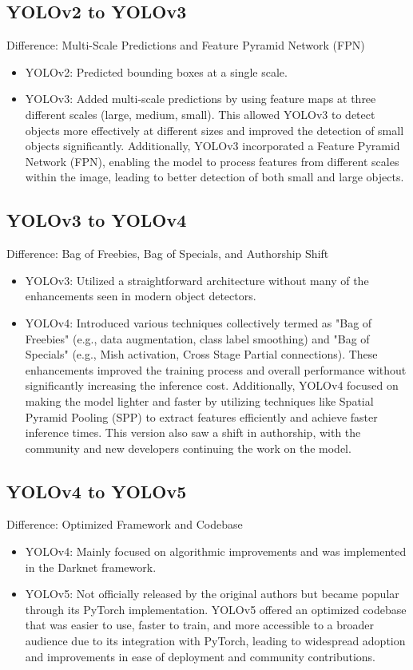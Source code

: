 \documentclass[conference]{IEEEtran}
\begin{document}
\subsection*{YOLOv2 to YOLOv3}
Difference: Multi-Scale Predictions and Feature Pyramid Network (FPN)
\begin{itemize}
  \item YOLOv2: Predicted bounding boxes at a single scale.
  \item YOLOv3: Added multi-scale predictions by using feature maps at three different scales (large, medium, small). This allowed YOLOv3 to detect objects more effectively at different sizes and improved the detection of small objects significantly. Additionally, YOLOv3 incorporated a Feature Pyramid Network (FPN), enabling the model to process features from different scales within the image, leading to better detection of both small and large objects.
\end{itemize}

\subsection*{YOLOv3 to YOLOv4}
Difference: Bag of Freebies, Bag of Specials, and Authorship Shift
\begin{itemize}
  \item YOLOv3: Utilized a straightforward architecture without many of the enhancements seen in modern object detectors.
  \item YOLOv4: Introduced various techniques collectively termed as "Bag of Freebies" (e.g., data augmentation, class label smoothing) and "Bag of Specials" (e.g., Mish activation, Cross Stage Partial connections). These enhancements improved the training process and overall performance without significantly increasing the inference cost. Additionally, YOLOv4 focused on making the model lighter and faster by utilizing techniques like Spatial Pyramid Pooling (SPP) to extract features efficiently and achieve faster inference times. This version also saw a shift in authorship, with the community and new developers continuing the work on the model.
\end{itemize}

\subsection*{YOLOv4 to YOLOv5}
Difference: Optimized Framework and Codebase
\begin{itemize}
  \item YOLOv4: Mainly focused on algorithmic improvements and was implemented in the Darknet framework.
  \item YOLOv5: Not officially released by the original authors but became popular through its PyTorch implementation. YOLOv5 offered an optimized codebase that was easier to use, faster to train, and more accessible to a broader audience due to its integration with PyTorch, leading to widespread adoption and improvements in ease of deployment and community contributions.
\end{itemize}
\end{document}
